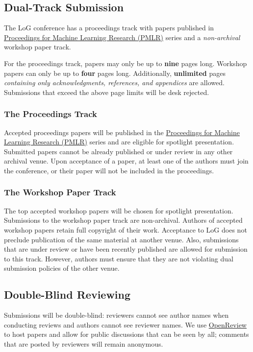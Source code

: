 \documentclass{article}
\begin{document}
\subsection{Dual-Track Submission}

The LoG conference has a proceedings track with papers published in \href{https://proceedings.mlr.press/}{Proceedings for Machine Learning Research (PMLR)} series and a \emph{non-archival} workshop paper track.

For the proceedings track, papers may only be up to \textbf{nine} pages long.
Workshop papers can only be up to \textbf{four} pages long.
Additionally, \textbf{unlimited} pages \emph{containing only acknowledgments, references, and appendices} are allowed.
Submissions that exceed the above page limits will be desk rejected.

\subsubsection{The Proceedings Track}
Accepted proceedings papers will be published in the \href{https://proceedings.mlr.press/}{Proceedings for Machine Learning Research (PMLR)} series and are eligible for spotlight presentation.
Submitted papers cannot be already published or under review in any other archival venue.
Upon acceptance of a paper, at least one of the authors must join the conference, or their paper will not be included in the proceedings.

\subsubsection{The Workshop Paper Track}
The top accepted workshop papers will be chosen for spotlight presentation.
Submissions to the workshop paper track are non-archival.
Authors of accepted workshop papers retain full copyright of their work.
Acceptance to LoG does not preclude publication of the same material at another venue.
Also, submissions that are under review or have been recently published are allowed for submission to this track.
However, authors must ensure that they are not violating dual submission policies of the other venue.

\subsection{Double-Blind Reviewing}
Submissions will be double-blind: reviewers cannot see author names when conducting reviews and authors cannot see reviewer names.
We use \href{https://openreview.net/group?id=logconference.io/LoG/2024/Conference}{OpenReview} to host papers and allow for public discussions that can be seen by all; comments that are posted by reviewers will remain anonymous.
\end{document}
